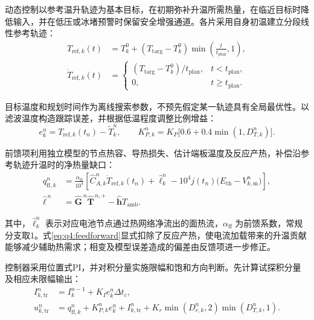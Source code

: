 动态控制以参考温升轨迹为基本目标，在初期弥补升温所需热量，在临近目标时降低输入，并在低压或冰堵预警时保留安全增强通道。各片采用自身初温建立分段线性参考轨迹：
\begin{equation}
\begin{aligned}
T_{\mathrm{ref},k}(t)&=T_k^0+
(T_{\mathrm{targ}}-T_k^0)\min\!\left(\frac{t}{t_{\mathrm{plan}}},1\right),
\\
\dot T_{\mathrm{ref},k}(t)&=\begin{cases}
(T_{\mathrm{targ}}-T_k^0)/t_{\mathrm{plan}}, & t<t_{\mathrm{plan}},\\
0, & t\geq t_{\mathrm{plan}}.
\end{cases}
\end{aligned}
\tag{7-18}\label{eq:q4:temperature_reference}
\end{equation}

目标温度和规划时间作为离线搜索参数，不预先假定某一轨迹具有全局最优性。以滤波温度构造跟踪误差，并根据低温程度调整比例增益：
\begin{equation}
e_k^n=T_{\mathrm{ref},k}(t_n)-\widetilde T_k^n,
\qquad
K_{P,k}^n=K_P\big[0.6+0.4\min(1,D_{T,k}^n)\big].
\tag{7-19}\label{eq:q4:tracking_error_gain}
\end{equation}

前馈项利用独立模型的节点热容、导热损失、估计端板温度及反应产热，补偿沿参考轨迹升温时的净热量缺口：
\begin{equation}
\begin{aligned}
q_{\mathrm{ff},k}^n
&=\frac{\alpha_{\mathrm{ff}}}{10^4}
\left[\widehat C_{A,k}^n\dot T_{\mathrm{ref},k}(t_n)
+\widehat\ell_k^n-10^4j(t_n)\big(E_{\mathrm{th}}-V_{k,\mathrm m}^n\big)\right],
\\
\widehat{\boldsymbol\ell}^{\,n}
&=\widehat{\boldsymbol G}^{\,n}\widehat{\boldsymbol T}^{\,n,+}
-\widehat{\boldsymbol h}T_{\mathrm{amb}}.
\end{aligned}
\tag{7-20}\label{eq:q4:feedforward}
\end{equation}

其中，$\widehat\ell_k^n$ 表示对应电池节点通过热网络净流出的面热流，$\alpha_{\mathrm{ff}}$ 为前馈系数，常规分支取1。式\eqref{eq:q4:feedforward}显式扣除了反应产热，使电流加载带来的升温贡献能够减少辅助热需求；相变及模型误差造成的偏差由反馈项进一步修正。

控制器采用位置式PI，并对积分量实施限幅和饱和方向判断。先计算试探积分量及相应未限幅输出：
\begin{equation}
\begin{aligned}
I_{k,\mathrm{tr}}^n&=I_k^{n-1}+K_Ie_k^n\Delta t_c,\\
u_{k,\mathrm{tr}}^n&=q_{\mathrm{ff},k}^n+K_{P,k}^ne_k^n+I_{k,\mathrm{tr}}^n
+K_r\min(D_{r,k}^n,2)\min(D_{T,k}^n,1).
\end{aligned}
\tag{7-21}\label{eq:q4:trial_integral}
\end{equation}

